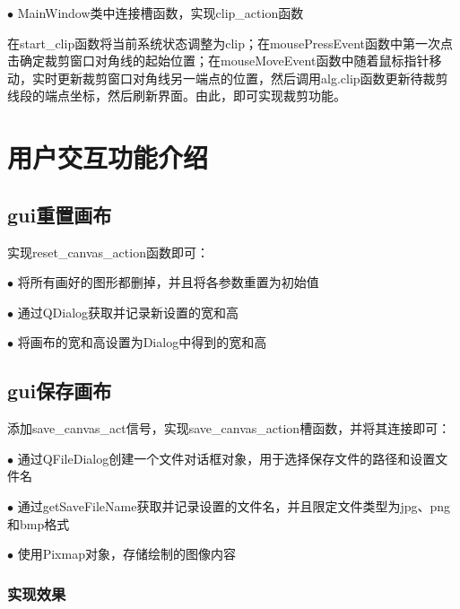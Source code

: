 \documentclass[a4paper,UTF8]{article}
\theoremstyle{definition}
\begin{document}
$\bullet$ MainWindow类中连接槽函数，实现clip\_action函数

在start\_clip函数将当前系统状态调整为clip；在mousePressEvent函数中第一次点击确定裁剪窗口对角线的起始位置；在mouseMoveEvent函数中随着鼠标指针移动，实时更新裁剪窗口对角线另一端点的位置，然后调用alg.clip函数更新待裁剪线段的端点坐标，然后刷新界面。由此，即可实现裁剪功能。

\section{用户交互功能介绍}

\subsection{gui重置画布}

实现reset\_canvas\_action函数即可：

$\bullet$ 将所有画好的图形都删掉，并且将各参数重置为初始值

$\bullet$ 通过QDialog获取并记录新设置的宽和高

$\bullet$ 将画布的宽和高设置为Dialog中得到的宽和高

\subsection{gui保存画布}

添加save\_canvas\_act信号，实现save\_canvas\_action槽函数，并将其连接即可：

$\bullet$ 通过QFileDialog创建一个文件对话框对象，用于选择保存文件的路径和设置文件名

$\bullet$ 通过getSaveFileName获取并记录设置的文件名，并且限定文件类型为jpg、png和bmp格式

$\bullet$ 使用Pixmap对象，存储绘制的图像内容

\subsubsection{实现效果}
\end{document}
